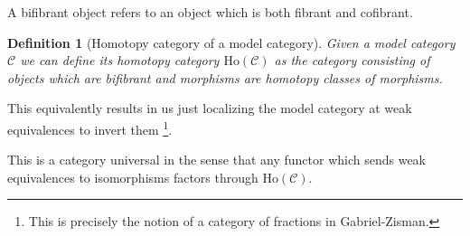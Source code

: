 \documentclass[12pt]{report}
\numberwithin{equation}{section}
\newtheorem{definition}[dummy]{Definition}
\begin{document}
	A bifibrant object refers to an object which is both fibrant and cofibrant.
	
	\begin{definition}[Homotopy category of a model category]
		Given a model category \( \mathcal{C} \) we can define its homotopy category \( \mathrm{Ho}(\mathcal{C}) \) as the category consisting of objects which are bifibrant and morphisms are homotopy classes of morphisms.
	\end{definition}
	This equivalently results in us just localizing the model category at weak equivalences to invert them \footnote{This is precisely the notion of a category of fractions in Gabriel-Zisman.}.
	
	This is a category universal in the sense that any functor which sends weak equivalences to isomorphisms factors through \( \mathrm{Ho}(\mathcal{C}) \).
	
\end{document}

